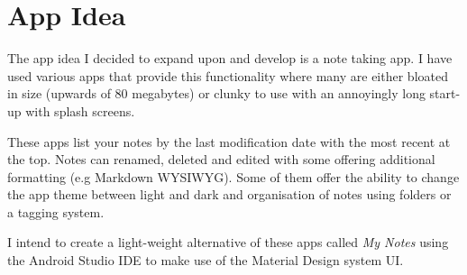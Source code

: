 \chapter{App Idea}

The app idea I decided to expand upon and develop is a note taking app. I have used various apps that provide this functionality where many are either bloated in size (upwards of 80 megabytes) or clunky to use with an annoyingly long start-up with splash screens.

These apps list your notes by the last modification date with the most recent at the top. Notes can renamed, deleted and edited with some offering additional formatting (e.g Markdown WYSIWYG). Some of them offer the ability to change the app theme between light and dark and organisation of notes using folders or a tagging system.

I intend to create a light-weight alternative of these apps called \textit{My Notes} using the Android Studio IDE to make use of the Material Design system UI.


